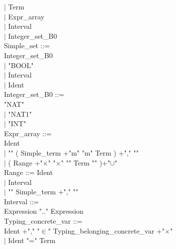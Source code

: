 \documentclass[12pt,a4paper,draft]{article}
\begin{document}
{\begin{sloppypar}
\hspace*{0.20in} $|$  Term\\ 
\hspace*{0.20in} $|$  Expr\_array \\ 
\hspace*{0.20in} $|$  Interval\\ 
\hspace*{0.20in} $|$   Integer\_set\_B0\\ 
Simple\_set ::= \\ 
\hspace*{0.20in}   Integer\_set\_B0\\ 
\hspace*{0.20in} $|$ "BOOL" \\ 
\hspace*{0.20in} $|$  Interval\\ 
\hspace*{0.20in} $|$ Ident \\ 
Integer\_set\_B0 ::=  \\ 
\hspace*{0.20in}  "NAT" \\ 
\hspace*{0.20in} $|$ "NAT1" \\ 
\hspace*{0.20in} $|$ "INT" \\ 
Expr\_array ::= \\ 
\hspace*{0.20in}  Ident \\ 
\hspace*{0.20in} $|$ "{" ( Simple\_term +"m"  "m" Term ) +","  "}" \\ 
\hspace*{0.20in} $|$ ( Range +"$\times$"  "$\times$"  "{" Term "}" )+"$\cup$"\\ 
Range ::= Ident \\ 
\hspace*{0.20in} $|$  Interval\\ 
\hspace*{0.20in} $|$ "{" Simple\_term +","  "}"\\ 
Interval ::= \\ 
\hspace*{0.20in}   Expression  ".."  Expression\\ 
Typing\_concrete\_var ::= \\ 
\hspace*{0.20in}  Ident +","   "$\in$"  Typing\_belonging\_concrete\_var +"$\times$"\\ 
\hspace*{0.20in} $|$ Ident  "="  Term\\ 

\end{sloppypar}}
\end{document}
